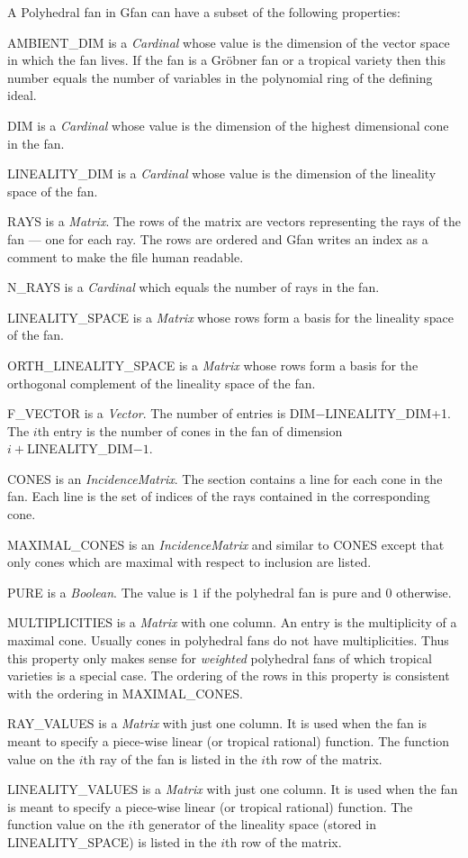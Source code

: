 A Polyhedral fan in Gfan can have a subset of the following properties:
\begin{description}
\item{AMBIENT\_DIM} is a \emph{Cardinal} whose value is the dimension of the vector space in which the fan lives. If the fan is a Gr\"obner fan or a tropical variety then this number equals the number of variables in the polynomial ring of the defining ideal.
\item{DIM} is a \emph{Cardinal} whose value is the dimension of the highest dimensional cone in the fan.
\item{LINEALITY\_DIM} is a \emph{Cardinal} whose value is the dimension of the lineality space of the fan.
\item{RAYS} is a \emph{Matrix}. The rows of the matrix are vectors representing the rays of the fan --- one for each ray. The rows are ordered and Gfan writes an index as a comment to make the file human readable.
\item{N\_RAYS} is a \emph{Cardinal} which equals the number of rays in the fan.
\item{LINEALITY\_SPACE} is a \emph{Matrix} whose rows form a basis for the lineality space of the fan.
\item{ORTH\_LINEALITY\_SPACE} is a \emph{Matrix} whose rows form a basis for the orthogonal complement of the lineality space of the fan.
\item{F\_VECTOR} is a \emph{Vector}. The number of entries is DIM$-$LINEALITY\_DIM+1. The $i$th entry is the number of cones in the fan of dimension\\ $i+$LINEALITY\_DIM$-1$.
\item{CONES} is an \emph{IncidenceMatrix}. The section contains a line for each cone in the fan. Each line is the set of indices of the rays contained in the corresponding cone. 
\item{MAXIMAL\_CONES} is an \emph{IncidenceMatrix} and similar to CONES except that only cones which are maximal with respect to inclusion are listed.
\item{PURE} is a \emph{Boolean}. The value is $1$ if the polyhedral fan is pure and $0$ otherwise.
\item{MULTIPLICITIES} is a \emph{Matrix} with one column. An entry is
the multiplicity of a maximal cone. Usually cones in polyhedral fans
do not have multiplicities. Thus this property only makes sense for
\emph{weighted} polyhedral fans of which tropical varieties is a
special case. The ordering of the rows in this property is consistent
with the ordering in MAXIMAL\_CONES.
\item{RAY\_VALUES} is a \emph{Matrix} with just one column. It is used when the fan is meant to specify a piece-wise linear (or tropical rational) function. The function value on the $i$th ray of the fan is listed in the $i$th row of the matrix.
\item{LINEALITY\_VALUES} is a \emph{Matrix} with just one column. It is used when the fan is meant to specify a piece-wise linear (or tropical rational) function. The function value on the $i$th generator of the lineality space (stored in LINEALITY\_SPACE) is listed in the $i$th row of the matrix.
\end{description}
